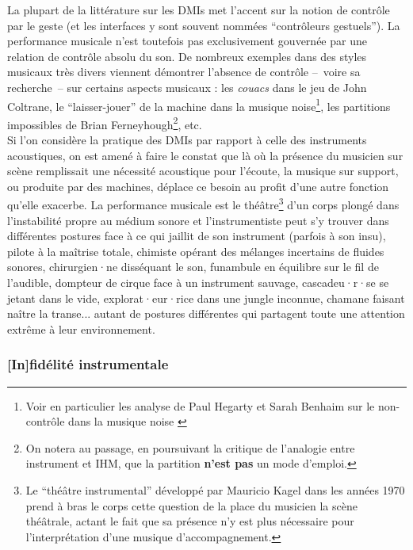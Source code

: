 \noindent La plupart de la littérature sur les \glspl{DMI} met l'accent sur la notion de contrôle par le geste (et les interfaces y sont souvent nommées ``contrôleurs gestuels''). La performance musicale n'est toutefois pas exclusivement gouvernée par une relation de contrôle absolu du son. De nombreux exemples dans des styles musicaux très divers viennent démontrer l'absence de contrôle --~voire sa recherche~-- sur certains aspects musicaux : les \textit{couacs} dans le jeu de John Coltrane, le ``laisser-jouer'' de la machine dans la musique noise\footnote{Voir en particulier les analyse de Paul Hegarty et Sarah Benhaim sur le non-contrôle dans la musique noise \cite{hegarty_noise_2007, benhaim_aux_2018}}, les partitions impossibles de Brian Ferneyhough\footnote{On notera au passage, en poursuivant la critique de l'analogie entre instrument et \gls{IHM}, que la partition \textbf{n'est pas} un mode d'emploi.}, etc.\\
\indent Si l'on considère la pratique des \glspl{DMI} par rapport à celle des instruments acoustiques, on est amené à faire le constat que là où la présence du musicien sur scène remplissait une nécessité acoustique pour l’écoute, la musique sur support, ou produite par des machines, déplace ce besoin au profit d’une autre fonction qu'elle exacerbe. La performance musicale est le théâtre\footnote{Le ``théâtre instrumental'' développé par Mauricio Kagel dans les années 1970 prend à bras le corps cette question de la place du musicien la scène théâtrale, actant le fait que sa présence n'y est plus nécessaire pour l'interprétation d'une musique d'accompagnement.} d'un corps plongé dans l'instabilité propre au médium sonore et l'instrumentiste peut s'y trouver dans différentes postures face à ce qui jaillit de son instrument (parfois à son insu), pilote à la maîtrise totale, chimiste opérant des mélanges incertains de fluides sonores, chirurgien·ne disséquant le son, funambule en équilibre sur le fil de l'audible, dompteur de cirque face à un instrument sauvage, cascadeu·r·se se jetant dans le vide, explorat·eur·rice dans une jungle inconnue, chamane faisant naître la transe... autant de postures différentes qui partagent toute une attention extrême à leur environnement.

\subsubsection{[In]fidélité instrumentale}

